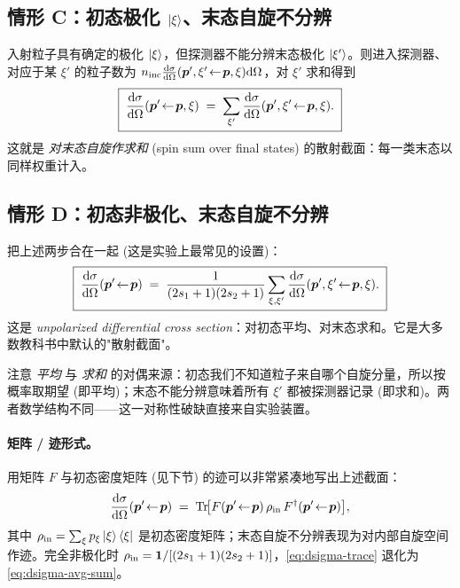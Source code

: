 \subsection{情形 C：初态极化 $\ket\xi$、末态自旋不分辨}

入射粒子具有确定的极化 $\ket\xi$，但探测器不能分辨末态极化 $\ket{\xi'}$。则进入探测器、对应于某 $\xi'$ 的粒子数为
$n_{\rm inc}\frac{\mathrm{d}\sigma}{\mathrm{d}\Omega}(\bm p',\xi'\!\leftarrow\!\bm p,\xi)\mathrm{d}\Omega$，对 $\xi'$ 求和得到
\begin{equation}
  \boxed{\;\frac{\mathrm{d}\sigma}{\mathrm{d}\Omega}(\bm p'\!\leftarrow\!\bm p,\xi)
  \;=\;\sum_{\xi'}\frac{\mathrm{d}\sigma}{\mathrm{d}\Omega}(\bm p',\xi'\!\leftarrow\!\bm p,\xi).\;}
  \label{eq:dsigma-sum-out}
\end{equation}
这就是 \emph{对末态自旋作求和} (spin sum over final states) 的散射截面：每一类末态以同样权重计入。

\subsection{情形 D：初态非极化、末态自旋不分辨}

把上述两步合在一起 (这是实验上最常见的设置)：
\begin{equation}
  \boxed{\;\frac{\mathrm{d}\sigma}{\mathrm{d}\Omega}(\bm p'\!\leftarrow\!\bm p)
  \;=\;\frac{1}{(2s_1+1)(2s_2+1)}\sum_{\xi,\xi'}\frac{\mathrm{d}\sigma}{\mathrm{d}\Omega}(\bm p',\xi'\!\leftarrow\!\bm p,\xi).\;}
  \label{eq:dsigma-avg-sum}
\end{equation}
这是 \emph{unpolarized differential cross section}：对初态平均、对末态求和。它是大多数教科书中默认的"散射截面"。

\begin{remark}
注意 \emph{平均} 与 \emph{求和} 的对偶来源：初态我们不知道粒子来自哪个自旋分量，所以按概率取期望 (即平均)；末态不能分辨意味着所有 $\xi'$ 都被探测器记录 (即求和)。两者数学结构不同——这一对称性破缺直接来自实验装置。
\end{remark}

\paragraph{矩阵 / 迹形式。}用矩阵 $F$ 与初态密度矩阵 (见下节) 的迹可以非常紧凑地写出上述截面：
\begin{equation}
  \frac{\mathrm{d}\sigma}{\mathrm{d}\Omega}(\bm p'\!\leftarrow\!\bm p)
  \;=\;\operatorname{Tr}\!\bigl[F(\bm p'\!\leftarrow\!\bm p)\,\rho_{\rm in}\,F^\dagger(\bm p'\!\leftarrow\!\bm p)\bigr],
  \label{eq:dsigma-trace}
\end{equation}
其中 $\rho_{\rm in}=\sum_\xi p_\xi \ket\xi\bra\xi$ 是初态密度矩阵；末态自旋不分辨表现为对内部自旋空间作迹。完全非极化时 $\rho_{\rm in}=\mathbf 1/[(2s_1+1)(2s_2+1)]$，\eqref{eq:dsigma-trace} 退化为 \eqref{eq:dsigma-avg-sum}。


